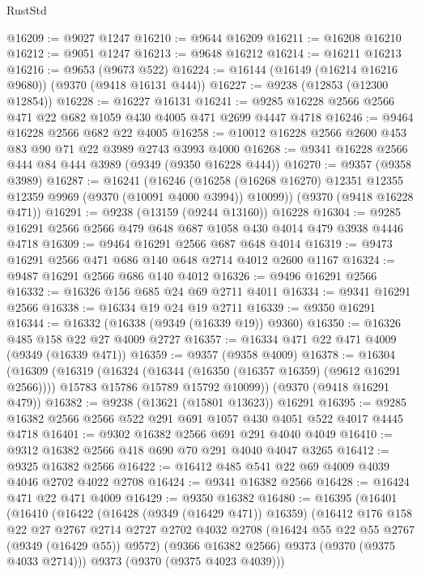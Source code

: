 \begin{lexlean}{RustStd}
\begin{coremodule}
{\begin{coremodule}
{{{{{{{{{{{{{{{{{{{{{{{{{{{{{{{{{{{{{{{@16209 := @9027 @1247
@16210 := @9644 @16209
@16211 := @16208 @16210
@16212 := @9051 @1247
@16213 := @9648 @16212
@16214 := @16211 @16213
@16216 := @9653 (@9673 @522)
@16224 := @16144 (@16149 (@16214 @16216 @9680)) (@9370 (@9418 @16131 @444))
@16227 := @9238 (@12853 (@12300 @12854))
@16228 := @16227 @16131
@16241 := @9285 @16228 @2566 @2566 @471 @22 @682 @1059 @430 @4005 @471 @2699 @4447 @4718
@16246 := @9464 @16228 @2566 @682 @22 @4005
@16258 := @10012 @16228 @2566 @2600 @453 @83 @90 @71 @22 @3989 @2743 @3993 @4000
@16268 := @9341 @16228 @2566 @444 @84 @444 @3989 (@9349 (@9350 @16228 @444))
@16270 := @9357 (@9358 @3989)
@16287 := @16241
    (@16246 (@16258 (@16268 @16270) @12351 @12355 @12359 @9969 (@9370 (@10091 @4000 @3994)) @10099))
    (@9370 (@9418 @16228 @471))
@16291 := @9238 (@13159 (@9244 @13160)) @16228
@16304 := @9285 @16291 @2566 @2566 @479 @648 @687 @1058 @430 @4014 @479 @3938 @4446 @4718
@16309 := @9464 @16291 @2566 @687 @648 @4014
@16319 := @9473 @16291 @2566 @471 @686 @140 @648 @2714 @4012 @2600 @1167
@16324 := @9487 @16291 @2566 @686 @140 @4012
@16326 := @9496 @16291 @2566
@16332 := @16326 @156 @685 @24 @69 @2711 @4011
@16334 := @9341 @16291 @2566
@16338 := @16334 @19 @24 @19 @2711
@16339 := @9350 @16291
@16344 := @16332 (@16338 (@9349 (@16339 @19)) @9360)
@16350 := @16326 @485 @158 @22 @27 @4009 @2727
@16357 := @16334 @471 @22 @471 @4009 (@9349 (@16339 @471))
@16359 := @9357 (@9358 @4009)
@16378 := @16304
    (@16309
      (@16319
        (@16324 (@16344 (@16350 (@16357 @16359) (@9612 @16291 @2566))))
        @15783
        @15786
        @15789
        @15792
        @10099))
    (@9370 (@9418 @16291 @479))
@16382 := @9238 (@13621 (@15801 @13623)) @16291
@16395 := @9285 @16382 @2566 @2566 @522 @291 @691 @1057 @430 @4051 @522 @4017 @4445 @4718
@16401 := @9302 @16382 @2566 @691 @291 @4040 @4049
@16410 := @9312 @16382 @2566 @418 @690 @70 @291 @4040 @4047 @3265
@16412 := @9325 @16382 @2566
@16422 := @16412 @485 @541 @22 @69 @4009 @4039 @4046 @2702 @4022 @2708
@16424 := @9341 @16382 @2566
@16428 := @16424 @471 @22 @471 @4009
@16429 := @9350 @16382
@16480 := @16395
    (@16401
      (@16410
        (@16422
          (@16428 (@9349 (@16429 @471)) @16359)
          (@16412
            @176
            @158
            @22
            @27
            @2767
            @2714
            @2727
            @2702
            @4032
            @2708
            (@16424 @55 @22 @55 @2767 (@9349 (@16429 @55)) @9572)
            (@9366 @16382 @2566)
            @9373
            (@9370 (@9375 @4033 @2714)))
          @9373
          (@9370 (@9375 @4023 @4039)))
}}}}}}}}}}}}}}}}}}}}}}}}}}}}}}}}}}}}}}}
\end{coremodule}}
\end{coremodule}
\end{lexlean}
